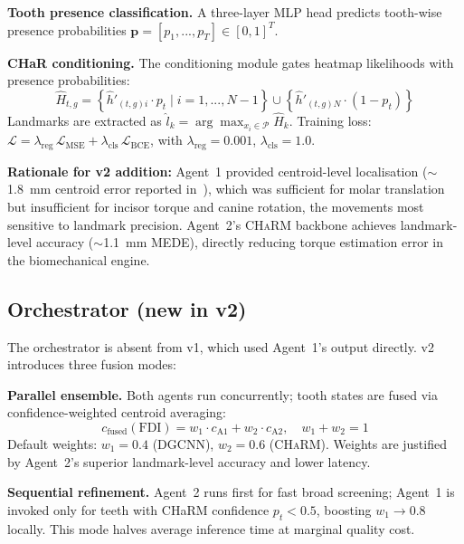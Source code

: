 \documentclass[10pt,twocolumn]{article}
\newcommand{\charm}{\textsc{CHaRM}}
\newcommand{\dgcnn}{\textsc{DGCNN}}
\newcommand{\NEW}[1]{\textbf{\textcolor{blue!70!black}{#1}}}  %
\begin{document}
\textbf{Tooth presence classification.}
A three-layer MLP head predicts tooth-wise presence probabilities
$\mathbf{p} = [p_1,...,p_T] \in [0,1]^T$.

\textbf{CHaR conditioning.}
The conditioning module gates heatmap likelihoods with presence probabilities:
\begin{equation}
  \hat{H}_{t,g} =
    \left\{
      \hat{h}'_{(t,g)i} \cdot p_t \;|\; i = 1,...,N-1
    \right\}
    \cup
    \left\{
      \hat{h}'_{(t,g)N} \cdot (1-p_t)
    \right\}
  \label{eq:char}
\end{equation}
Landmarks are extracted as $\hat{l}_k = \arg\max_{x_i \in \mathcal{P}} \hat{H}_k$.
Training loss: $\mathcal{L} = \lambda_\text{reg}\,\mathcal{L}_\text{MSE} +
\lambda_\text{cls}\,\mathcal{L}_\text{BCE}$,
with $\lambda_\text{reg} = 0.001$, $\lambda_\text{cls} = 1.0$.

\textbf{Rationale for v2 addition:} Agent~1 provided centroid-level
localisation ($\sim$1.8~mm centroid error reported in~\cite{lansiaux2026orthoaiv1}),
which was sufficient for molar translation but insufficient for
incisor torque and canine rotation, the movements most sensitive to
landmark precision.
Agent~2's \charm{} backbone achieves landmark-level accuracy ($\sim$1.1~mm MEDE),
directly reducing torque estimation error in the biomechanical engine.

\subsection{\NEW{Orchestrator (new in v2)}}

The orchestrator is absent from v1, which used Agent~1's output directly.
v2 introduces three fusion modes:

\textbf{Parallel ensemble.}
Both agents run concurrently; tooth states are fused via
confidence-weighted centroid averaging:
\begin{equation}
  c_\text{fused}(\text{FDI}) =
    w_1 \cdot c_{\text{A1}} + w_2 \cdot c_{\text{A2}},
  \quad w_1 + w_2 = 1
\end{equation}
Default weights: $w_1 = 0.4$ (\dgcnn{}), $w_2 = 0.6$ (\charm{}).
Weights are justified by Agent~2's superior landmark-level accuracy
and lower latency.

\textbf{Sequential refinement.}
Agent~2 runs first for fast broad screening; Agent~1 is invoked only for
teeth with CHaRM confidence $p_t < 0.5$, boosting $w_1 \to 0.8$ locally.
This mode halves average inference time at marginal quality cost.
\end{document}
